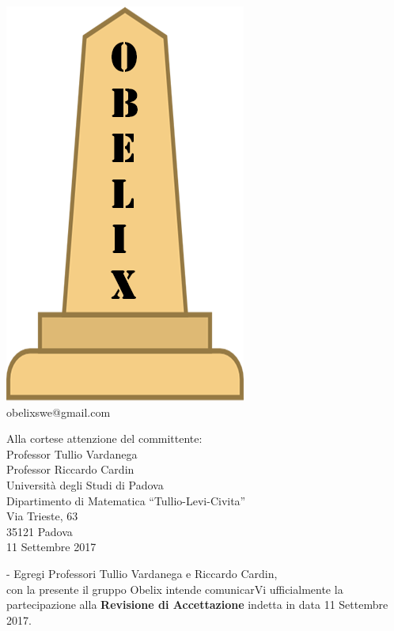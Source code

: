 \documentclass[10 pt,a4paper]{article}
\begin{document}
\begin{minipage}[adjusting]{.3\textwidth}
  \begin{centering}
    \includegraphics[width=.5\textwidth]{../../file_comuni/immagini/obelisk_sample_02.png}
    \\
    obelixswe@gmail.com
  \end{centering}
\end{minipage}


\begin{flushright}
  Alla cortese attenzione del committente: \\
\vspace{0.08in}
  Professor Tullio Vardanega \\
  Professor Riccardo Cardin \\
  Università degli Studi di Padova \\
  Dipartimento di Matematica ``Tullio-Levi-Civita''\\
  Via Trieste, 63 \\
  35121 Padova \\
\vspace{0.08in}
  11 Settembre 2017 \\
\end{flushright}-
\vspace{0.1in}
Egregi Professori Tullio Vardanega e Riccardo Cardin,\\
con la presente il gruppo Obelix intende comunicarVi ufficialmente
la partecipazione alla \textbf{Revisione di Accettazione} indetta in
data 11 Settembre 2017.
\vspace{.05in}
\end{document}
